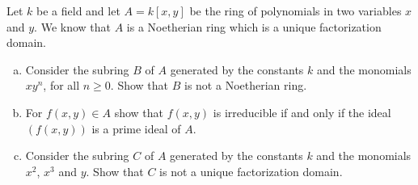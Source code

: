\documentclass{article}
\newcounter{Problem}
\newenvironment{Problem}{\begin{Exercise}[name={Problem},
                                          counter={Problem}]}
                        {\end{Exercise}}
\begin{document}
\pagebreak

\begin{Problem}
  Let $k$ be a field and let $A = k[x, y]$ be the ring of polynomials in
  two variables $x$ and $y$. We know that $A$ is a Noetherian ring which
  is a unique factorization domain.
  \begin{enumerate}[(a)]
    \item{
      Consider the subring $B$ of $A$ generated by the constants $k$
      and the monomials $xy^n$, for all $n \geq 0$. Show that $B$ is
      not a Noetherian ring.
    }
    \item{
      For $f(x, y) \in A$ show that $f(x, y)$ is irreducible if and
      only if the ideal $(f(x,y))$ is a prime ideal of $A$.
    }
    \item{
      Consider the subring $C$ of $A$ generated by the constants $k$
      and the monomials $x^2$, $x^3$ and $y$. Show that $C$ is not a
      unique factorization domain.
    }
  \end{enumerate}
\end{Problem}
\end{document}
